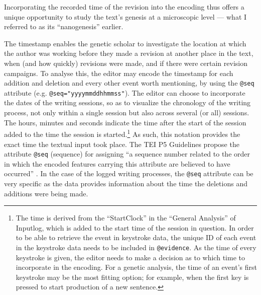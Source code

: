 \begin{paper}
\noindent 
Incorporating the recorded time of the revision
into the encoding thus offers a unique opportunity to study the text's
genesis at a microscopic level --- what I referred to as its
``nanogenesis'' earlier.

The timestamp enables the genetic scholar to investigate the location at
which the author was working before they made a revision at another
place in the text, when (and how quickly) revisions were made, and if there
were certain revision campaigns. To analyse this, the
editor may encode the timestamp for each addition and deletion and every
other event worth mentioning, by using the \lstinline[language=XML]!@seq! attribute (e.g.
\lstinline[language=XML]!@seq="yyyymmddhhmmss"!). The editor can choose to incorporate the dates
of the writing sessions, so as to visualize the chronology of the
writing process, not only within a single session but also across
several (or all) sessions. The hours, minutes and seconds indicate the
time after the start of the session added to the time the session is
started.\footnote{The time is derived from the ``StartClock'' in the
  ``General Analysis'' of Inputlog, which is added to the start time of the session in question. In order to be able to retrieve the
  event in keystroke data, the unique ID of each event in the keystroke
  data needs to be included in \lstinline[language=XML]!@evidence!. As the time of every keystroke
  is given, the editor needs to make a decision as to which time to
  incorporate in the encoding. For a genetic analysis, the time of an
  event's first keystroke may be the most fitting option; for example,
  when the first key is pressed to start production of a new sentence.}
As such, this notation provides the exact time the textual input took
place. The TEI P5 Guidelines propose the attribute \lstinline[language=XML]!@seq! (sequence) for
assigning ``a sequence number related to the order in which the encoded
features carrying this attribute are believed to have occurred''
\citep[§11.3.1.4]{the_tei_consortium_tei_2020}. In the case of the logged writing processes, the \lstinline[language=XML]!@seq!
attribute can be very specific as the data provides information about
the time the deletions and additions were being made.


\end{paper}
